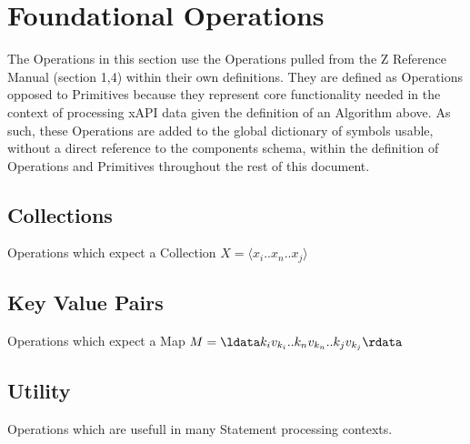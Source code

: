 \documentclass{article}
\begin{document}




\section{Foundational Operations}
The Operations in this section use the Operations pulled from the Z Reference Manual (section 1,4) within their own definitions.
They are defined as Operations opposed to Primitives because they represent core functionality needed in the context
of processing xAPI data given the definition of an Algorithm above. As such, these Operations are added to the global
dictionary of symbols usable, without a direct reference to the components schema,
within the definition of Operations and Primitives throughout the rest of this document.

\subsection{Collections}
Operations which expect a Collection $X = \langle x_{i}..x_{n}..x_{j} \rangle$






\subsection{Key Value Pairs}
Operations which expect a Map $M = \ldata k_{i}v_{k_{i}}..k_{n}v_{k_{n}}..k_{j}v_{k_{j}} \rdata$






\subsection{Utility}
Operations which are usefull in many Statement processing contexts.




\end{document}
